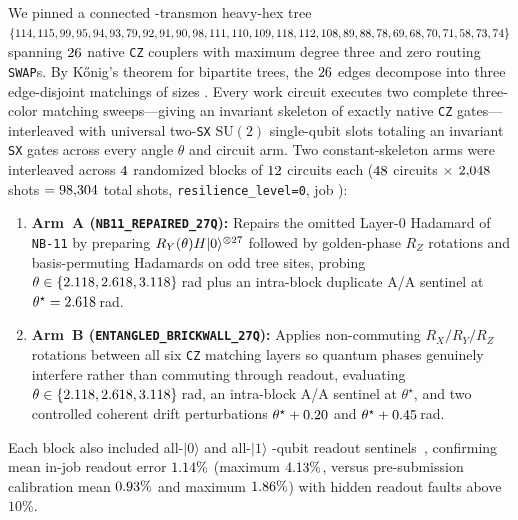\documentclass[aps,prapplied,reprint,longbibliography]{revtex4-2}
\begin{document}
We pinned a connected \WpFezQubits{}-transmon heavy-hex tree $\{114, 115, 99, 95, 94, 93, 79, 92, 91, 90, 98, 111, 110, 109, 118, 112, 108, 89, 88, 78, 69, 68, 70, 71, 58, 73, 74{}\}$ spanning $26{}$ native \texttt{CZ} couplers with maximum degree three and zero routing \texttt{SWAP}s. By K\H{o}nig's theorem for bipartite trees, the $26{}$ edges decompose into three edge-disjoint matchings of sizes \WpKonigSizes{}. Every work circuit executes two complete three-color matching sweeps---giving an invariant skeleton of exactly \WpFezCzCount{} native \texttt{CZ} gates---interleaved with universal two-\texttt{SX} $\mathrm{SU}(2)$ single-qubit slots totaling an invariant \WpFezSxCount{} \texttt{SX} gates across every angle $\theta$ and circuit arm. Two constant-skeleton arms were interleaved across $4{}$ randomized blocks of $12{}$ circuits each ($48{}$ circuits $\times$ $2{,}048{}$ shots $= 98{,}304{}$ total shots, \texttt{resilience\_level=0}, job \texttt{\WpFezJobId{}}):
\begin{enumerate}
\item \textbf{Arm~A (\texttt{NB11\_REPAIRED\_27Q}):} Repairs the omitted Layer-0 Hadamard of \texttt{NB-11} by preparing $R_Y(\theta)H|0\rangle^{\otimes 27{}}$ followed by golden-phase $R_Z$ rotations and basis-permuting Hadamards on odd tree sites, probing $\theta \in \{2.118{}, 2.618{}, 3.118{}\}$\,rad plus an intra-block duplicate A/A sentinel at $\theta^\star = 2.618{}$\,rad.
\item \textbf{Arm~B (\texttt{ENTANGLED\_BRICKWALL\_27Q}):} Applies non-commuting $R_X / R_Y / R_Z$ rotations between all six \texttt{CZ} matching layers so quantum phases genuinely interfere rather than commuting through readout, evaluating $\theta \in \{2.118{}, 2.618{}, 3.118{}\}$\,rad, an intra-block A/A sentinel at $\theta^\star$, and two controlled coherent drift perturbations $\theta^\star + 0.20{}$ and $\theta^\star + 0.45{}$\,rad.
\end{enumerate}
Each block also included all-$|0\rangle$ and all-$|1\rangle$ \WpFezQubits{}-qubit readout sentinels~\cite{davis2026ro06}, confirming mean in-job readout error $1.14{}\%$ (maximum $4.13{}\%$, versus pre-submission calibration mean $0.93{}\%$ and maximum $1.86{}\%$) with \WpHiddenRoFaults{} hidden readout faults above $10\%$.
\end{document}
